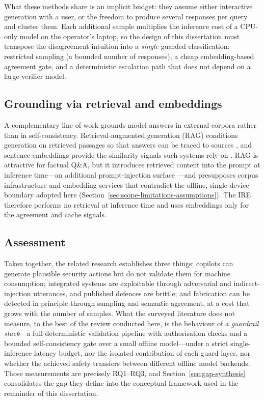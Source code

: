 What these methods share is an implicit budget: they assume either interactive
generation with a user, or the freedom to produce several responses per query
and cluster them. Each additional sample multiplies the inference cost of a
CPU-only model on the operator's laptop, so the design of this dissertation
must transpose the disagreement intuition into a \emph{single} guarded
classification: restricted sampling (a bounded number of responses), a cheap
embedding-based agreement gate, and a deterministic escalation path that does
not depend on a large verifier model.

\subsection*{Grounding via retrieval and embeddings}

A complementary line of work grounds model answers in external corpora rather
than in self-consistency. Retrieval-augmented generation (RAG) conditions
generation on retrieved passages so that answers can be traced to sources
\parencite{lewis2020rag}, and sentence embeddings provide the similarity
signals such systems rely on \parencite{reimers2019sbert}. RAG is attractive
for factual Q\&A, but it introduces retrieved content into the prompt at
inference time---an additional prompt-injection surface
\parencite{greshake2023indirect}---and presupposes corpus infrastructure and
embedding services that contradict the offline, single-device boundary adopted
here (Section~\ref{sec:scope-limitations-assumptions}). The IRE therefore
performs no retrieval at inference time and uses embeddings only for the
agreement and cache signals.

\subsection*{Assessment}

Taken together, the related research establishes three things: copilots can
generate plausible security actions but do not validate them for machine
consumption; integrated systems are exploitable through adversarial and
indirect-injection utterances, and published defences are brittle; and
fabrication can be detected in principle through sampling and semantic
agreement, at a cost that grows with the number of samples. What the surveyed
literature does not measure, to the best of the review conducted here, is the
behaviour of a \emph{guardrail stack}---a full deterministic validation
pipeline with authorisation checks and a bounded self-consistency gate over a
small offline model---under a strict single-inference latency budget, nor the
isolated contribution of each guard layer, nor whether the achieved safety
transfers between different offline model backends. Those measurements are
precisely RQ1--RQ3, and Section~\ref{sec:gap-synthesis} consolidates the gap
they define into the conceptual framework used in the remainder of this
dissertation.

